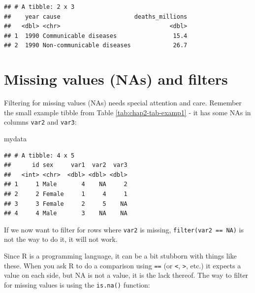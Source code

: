 \documentclass[
  12pt,
  krantz2]{krantz}
\makeatletter
\newenvironment{Shaded}{\begin{snugshade}}{\end{snugshade}}
\newcommand{\KeywordTok}[1]{\textcolor[rgb]{0.13,0.29,0.53}{\textbf{#1}}}
\newcommand{\NormalTok}[1]{#1}
\newcommand{\OperatorTok}[1]{\textcolor[rgb]{0.81,0.36,0.00}{\textbf{#1}}}
\newcommand{\StringTok}[1]{\textcolor[rgb]{0.31,0.60,0.02}{#1}}
\newenvironment{kframe}{%
\medskip{}
\setlength{\fboxsep}{.8em}
 \def\at@end@of@kframe{}%
 \ifinner\ifhmode%
  \def\at@end@of@kframe{\end{minipage}}%
  \begin{minipage}{\columnwidth}%
 \fi\fi%
 \def\FrameCommand##1{\hskip\@totalleftmargin \hskip-\fboxsep
 \colorbox{shadecolor}{##1}\hskip-\fboxsep
     \hskip-\linewidth \hskip-\@totalleftmargin \hskip\columnwidth}%
 \MakeFramed {\advance\hsize-\width
   \@totalleftmargin\z@ \linewidth\hsize
   \@setminipage}}%
 {\par\unskip\endMakeFramed%
 \at@end@of@kframe}
\renewenvironment{Shaded}{\begin{kframe}}{\end{kframe}}
\makeatother
\begin{document}
\begin{verbatim}
## # A tibble: 2 x 3
##    year cause                     deaths_millions
##   <dbl> <chr>                               <dbl>
## 1  1990 Communicable diseases                15.4
## 2  1990 Non-communicable diseases            26.7
\end{verbatim}

\hypertarget{missing-values-nas-and-filters}{%
\section{Missing values (NAs) and filters}\label{missing-values-nas-and-filters}}


Filtering for missing values (NAs) needs special attention and care.
Remember the small example tibble from Table \ref{tab:chap2-tab-examp1} - it has some NAs in columns \texttt{var2} and \texttt{var3}:

\begin{Shaded}
\begin{Highlighting}[]
\NormalTok{mydata}
\end{Highlighting}
\end{Shaded}

\begin{verbatim}
## # A tibble: 4 x 5
##      id sex     var1  var2  var3
##   <int> <chr>  <dbl> <dbl> <dbl>
## 1     1 Male       4    NA     2
## 2     2 Female     1     4     1
## 3     3 Female     2     5    NA
## 4     4 Male       3    NA    NA
\end{verbatim}

If we now want to filter for rows where \texttt{var2} is missing, \texttt{filter(var2\ ==\ NA)} is not the way to do it, it will not work.

Since R is a programming language, it can be a bit stubborn with things like these.
When you ask R to do a comparison using \texttt{==} (or \texttt{\textless{}}, \texttt{\textgreater{}}, etc.) it expects a value on each side, but NA is not a value, it is the lack thereof.
The way to filter for missing values is using the \texttt{is.na()} function:

\begin{Shaded}
\end{Shaded}
\end{document}
